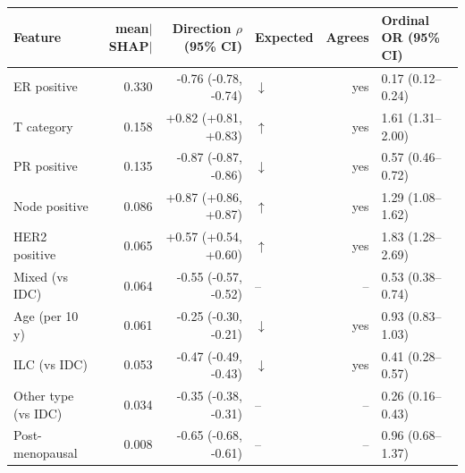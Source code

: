 \begin{tabular}{lrrlrl}
\toprule
Feature & mean$|$SHAP$|$ & Direction $\rho$ (95\% CI) & Expected & Agrees & Ordinal OR (95\% CI) \\
\midrule
ER positive & 0.330 & -0.76 (-0.78, -0.74) & $\downarrow$ & yes & 0.17 (0.12--0.24) \\
T category & 0.158 & +0.82 (+0.81, +0.83) & $\uparrow$ & yes & 1.61 (1.31--2.00) \\
PR positive & 0.135 & -0.87 (-0.87, -0.86) & $\downarrow$ & yes & 0.57 (0.46--0.72) \\
Node positive & 0.086 & +0.87 (+0.86, +0.87) & $\uparrow$ & yes & 1.29 (1.08--1.62) \\
HER2 positive & 0.065 & +0.57 (+0.54, +0.60) & $\uparrow$ & yes & 1.83 (1.28--2.69) \\
Mixed (vs IDC) & 0.064 & -0.55 (-0.57, -0.52) & -- & -- & 0.53 (0.38--0.74) \\
Age (per 10 y) & 0.061 & -0.25 (-0.30, -0.21) & $\downarrow$ & yes & 0.93 (0.83--1.03) \\
ILC (vs IDC) & 0.053 & -0.47 (-0.49, -0.43) & $\downarrow$ & yes & 0.41 (0.28--0.57) \\
Other type (vs IDC) & 0.034 & -0.35 (-0.38, -0.31) & -- & -- & 0.26 (0.16--0.43) \\
Post-menopausal & 0.008 & -0.65 (-0.68, -0.61) & -- & -- & 0.96 (0.68--1.37) \\
\bottomrule
\end{tabular}